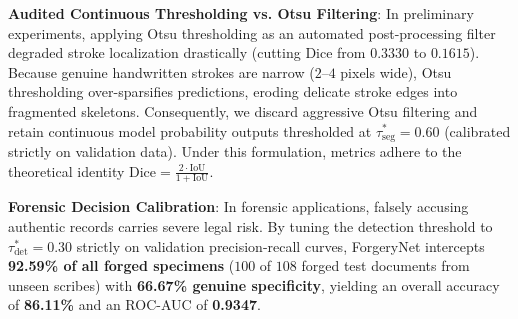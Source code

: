 \documentclass[runningheads]{llncs}
\begin{document}
\noindent
\textbf{Audited Continuous Thresholding vs. Otsu Filtering}: In preliminary experiments, applying Otsu thresholding \cite{bib18} as an automated post-processing filter degraded stroke localization drastically (cutting Dice from $0.3330$ to $0.1615$). Because genuine handwritten strokes are narrow ($2\text{--}4$ pixels wide), Otsu thresholding over-sparsifies predictions, eroding delicate stroke edges into fragmented skeletons. Consequently, we discard aggressive Otsu filtering and retain continuous model probability outputs thresholded at $\tau_{\text{seg}}^* = 0.60$ (calibrated strictly on validation data). Under this formulation, metrics adhere to the theoretical identity $\text{Dice} = \frac{2 \cdot \text{IoU}}{1 + \text{IoU}}$.

\noindent
\textbf{Forensic Decision Calibration}: In forensic applications, falsely accusing authentic records carries severe legal risk. By tuning the detection threshold to $\tau_{\text{det}}^* = 0.30$ strictly on validation precision-recall curves, ForgeryNet intercepts \textbf{92.59\% of all forged specimens} ($100$ of $108$ forged test documents from unseen scribes) with \textbf{66.67\% genuine specificity}, yielding an overall accuracy of \textbf{86.11\%} and an ROC-AUC of \textbf{0.9347}.
\end{document}
